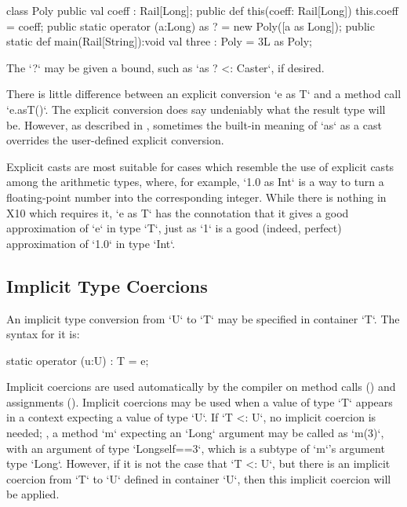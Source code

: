 \begin{ex}
\begin{xten}
class Poly {
  public val coeff : Rail[Long];
  public def this(coeff: Rail[Long]) { this.coeff = coeff;}
  public static operator (a:Long) as ? = new Poly([a as Long]);
  public static def main(Rail[String]):void {
     val three : Poly = 3L as Poly;
  }
}
\end{xten}
%
\end{ex}
The \xcd`?` may be given a bound, such as \xcd`as ? <: Caster`, if desired.
  

There is little difference between an explicit conversion \xcd`e as T` and a
method call \xcd`e.asT()`.  The explicit conversion does say undeniably what
the result type will be.  However, as described in ,
sometimes the built-in meaning of \xcd`as` as a cast overrides the
user-defined explicit conversion.  

Explicit casts are most suitable for cases
which resemble the use of explicit casts among the arithmetic types, where, 
for example, \xcd`1.0 as Int` is a way to turn a floating-point number into the
corresponding integer.  
While there is nothing in X10 which
requires it, \xcd`e as T` has the connotation that it gives a good
approximation of \xcd`e` in type \xcd`T`, just as \xcd`1` is a good
(indeed, perfect) approximation of \xcd`1.0` in type \xcd`Int`.  

\subsection{Implicit Type Coercions}
\label{sect:ImplicitCoercion}

An implicit type conversion from \xcd`U`  to \xcd`T` may be specified in
container \xcd`T`.  
The syntax for it is: 
\begin{xten}
static operator (u:U) : T = e;
\end{xten}



Implicit coercions are used automatically by the compiler on method calls 
() and assignments ().
Implicit coercions may be used when a value of type \xcd`T` appears in a
context expecting a value of type \xcd`U`.  If \xcd`T <: U`, no implicit
coercion is needed; \eg, a method \xcd`m` expecting an \xcd`Long` argument may 
be called as \xcd`m(3)`, with an argument of type \xcd`Long{self==3}`, which is
a subtype of \xcd`m`'s argument type \xcd`Long`. 
However, if it is not the case that \xcd`T <: U`, but there is an implicit
coercion from \xcd`T` to \xcd`U` defined in container \xcd`U`, then this
implicit coercion will be applied.


